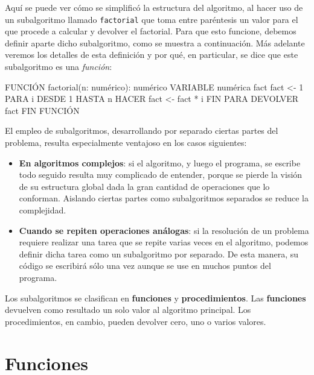 \documentclass[
]{book}
\newenvironment{Shaded}{\begin{snugshade}}{\end{snugshade}}
\newcommand{\NormalTok}[1]{#1}
\providecommand{\tightlist}{%
  \setlength{\itemsep}{0pt}\setlength{\parskip}{0pt}}
\begin{document}
Aquí se puede ver cómo se simplificó la estructura del algoritmo, al hacer uso de un subalgoritmo llamado \texttt{factorial} que toma entre paréntesis un valor para el que procede a calcular y devolver el factorial. Para que esto funcione, debemos definir aparte dicho subalgoritmo, como se muestra a continuación. Más adelante veremos los detalles de esta definición y por qué, en particular, se dice que este subalgoritmo es una \emph{función}:

\begin{Shaded}
\begin{Highlighting}[]
\NormalTok{FUNCIÓN factorial(n: numérico): numérico}
\NormalTok{    VARIABLE numérica fact}
\NormalTok{    fact \textless{}{-} 1}
\NormalTok{    PARA i DESDE 1 HASTA n HACER}
\NormalTok{        fact \textless{}{-} fact * i}
\NormalTok{    FIN PARA}
\NormalTok{    DEVOLVER fact}
\NormalTok{FIN FUNCIÓN}
\end{Highlighting}
\end{Shaded}

El empleo de subalgoritmos, desarrollando por separado ciertas partes del problema, resulta especialmente ventajoso en los casos siguientes:

\begin{itemize}
\tightlist
\item
  \textbf{En algoritmos complejos}: si el algoritmo, y luego el programa, se escribe todo seguido resulta muy complicado de entender, porque se pierde la visión de su estructura global dada la gran cantidad de operaciones que lo conforman. Aislando ciertas partes como subalgoritmos separados se reduce la complejidad.
\item
  \textbf{Cuando se repiten operaciones análogas}: si la resolución de un problema requiere realizar una tarea que se repite varias veces en el algoritmo, podemos definir dicha tarea como un subalgoritmo por separado. De esta manera, su código se escribirá sólo una vez aunque se use en muchos puntos del programa.
\end{itemize}

Los subalgoritmos se clasifican en \textbf{funciones} y \textbf{procedimientos}. Las \textbf{funciones} devuelven como resultado un solo valor al algoritmo principal. Los procedimientos, en cambio, pueden devolver cero, uno o varios valores.

\hypertarget{funciones}{%
\section{Funciones}\label{funciones}}
\end{document}
